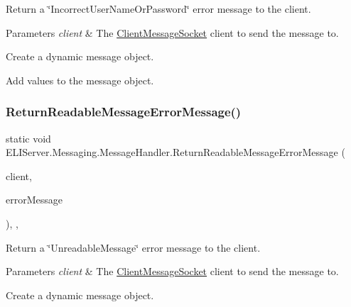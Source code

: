 Return a \char`\"{}\+Incorrect\+User\+Name\+Or\+Password\char`\"{} error message to the client. 


\begin{DoxyParams}{Parameters}
{\em client} & The \hyperlink{class_e_l_i_server_1_1_messaging_1_1_client_message_socket}{Client\+Message\+Socket} client to send the message to.\\
\hline
\end{DoxyParams}
Create a dynamic message object.

Add values to the message object. \mbox{\label{class_e_l_i_server_1_1_messaging_1_1_message_handler_af295ba9c01e4e01a19edba696944cfae}} 
\subsubsection{\texorpdfstring{Return\+Readable\+Message\+Error\+Message()}{ReturnReadableMessageErrorMessage()}}
{\footnotesize\ttfamily static void E\+L\+I\+Server.\+Messaging.\+Message\+Handler.\+Return\+Readable\+Message\+Error\+Message (\begin{DoxyParamCaption}\item[{\hyperlink{class_e_l_i_server_1_1_messaging_1_1_client_message_socket}{Client\+Message\+Socket}}]{client,  }\item[{String}]{error\+Message }\end{DoxyParamCaption})\hspace{0.3cm}{\ttfamily [inline]}, {\ttfamily [static]}, {\ttfamily [private]}}



Return a \char`\"{}\+Unreadable\+Message\char`\"{} error message to the client. 


\begin{DoxyParams}{Parameters}
{\em client} & The \hyperlink{class_e_l_i_server_1_1_messaging_1_1_client_message_socket}{Client\+Message\+Socket} client to send the message to.\\
\hline
\end{DoxyParams}
Create a dynamic message object.


